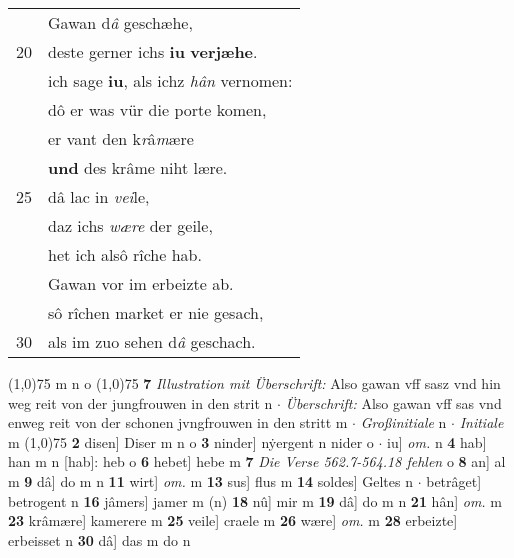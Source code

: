 \documentclass[8pt,a4paper,notitlepage]{article}
\begin{document}
\begin{table}[ht]
\begin{minipage}[t]{0.5\linewidth}
\begin{tabular}{rl}
 & Gawan d\textit{â} geschæhe,\\ 
20 & deste gerner ichs \textbf{iu} \textbf{verjæhe}.\\ 
 & ich sage \textbf{iu}, als ichz \textit{hân} vernomen:\\ 
 & dô er was vür die porte komen,\\ 
 & er vant den k\textit{r}â\textit{m}ære\\ 
 & \textbf{und} des krâme niht lære.\\ 
25 & dâ lac in \textit{vei}le,\\ 
 & daz ichs \textit{wære} der geile,\\ 
 & het ich alsô rîche hab.\\ 
 & Gawan vor im erbeizte ab.\\ 
 & sô rîchen market er nie gesach,\\ 
30 & als im zuo sehen d\textit{â} geschach.\\ 
\end{tabular}
\scriptsize
\line(1,0){75} \newline
m n o \newline
\line(1,0){75} \newline
\textbf{7} \textit{Illustration mit Überschrift:} Also gawan vff sasz vnd hin weg reit von der jungfrouwen in den strit n   $\cdot$ \textit{Überschrift:} Also gawan vff sas vnd enweg reit von der schonen jvngfrouwen in den stritt m   $\cdot$ \textit{Großinitiale} n   $\cdot$ \textit{Initiale} m  \newline
\line(1,0){75} \newline
\textbf{2} disen] Diser m n o \textbf{3} ninder] nẏergent n nider o  $\cdot$ iu] \textit{om.} n \textbf{4} hab] han m n [hab]: heb o \textbf{6} hebet] hebe m \textbf{7} \textit{Die Verse 562.7-564.18 fehlen} o  \textbf{8} an] al m \textbf{9} dâ] do m n \textbf{11} wirt] \textit{om.} m \textbf{13} sus] flus m \textbf{14} soldes] Geltes n  $\cdot$ betrâget] betrogent n \textbf{16} jâmers] jamer m (n) \textbf{18} nû] mir m \textbf{19} dâ] do m n \textbf{21} hân] \textit{om.} m \textbf{23} krâmære] kamerere m \textbf{25} veile] craele m \textbf{26} wære] \textit{om.} m \textbf{28} erbeizte] erbeisset n \textbf{30} dâ] das m do n \newline
\end{minipage}
\end{table}
\newpage
\end{document}
